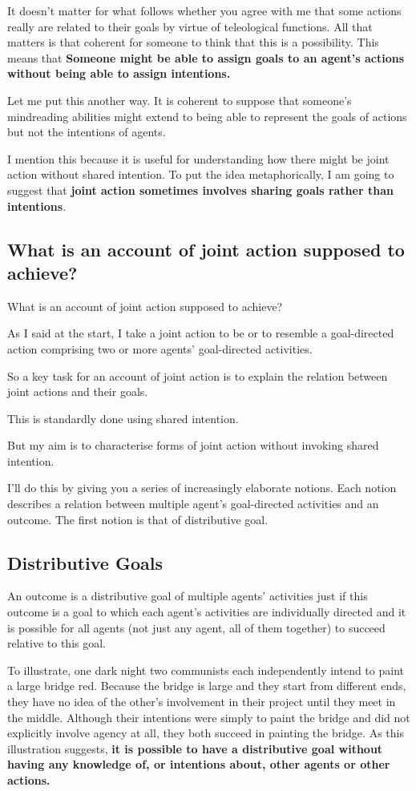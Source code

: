 \documentclass[12pt,a4paper]{extarticle}
\begin{document}
It doesn't matter for what follows whether you agree with me that some actions really are related to their goals by virtue of teleological functions.  
All that matters is that coherent for someone to think that this is a possibility.
This means that \textbf{Someone might be able to assign goals to an agent's actions without being able to assign intentions.}

Let me put this another way.
It is coherent to suppose that someone's mindreading abilities might extend to being able to represent the goals of actions but not the intentions of agents.

I mention this because it is useful for understanding how there might be joint action without shared intention.
To put the idea metaphorically, I am going to suggest that \textbf{joint action sometimes involves sharing goals rather than intentions}.


\subsection{What is an account of joint action supposed to achieve?}
What is an account of joint action supposed to achieve?

As I said at the start, I take a joint action to be or to resemble a goal-directed action comprising two or more agents' goal-directed activities.

So a key task for an account of joint action is to explain the relation between joint actions and their goals.

This is standardly done using shared intention.

But my aim is to characterise forms of joint action without invoking shared intention.

I'll do this by giving you a series of increasingly elaborate notions.  
Each notion describes a relation between multiple agent's goal-directed activities and an outcome.
The first notion is that of distributive goal.


\subsection{Distributive Goals}
An outcome is a distributive goal of multiple agents' activities just if this outcome is a goal to which each agent's activities are individually directed and it is possible for all agents (not just any agent, all of them together) to succeed relative to this goal.

To illustrate, one dark night two communists  each independently intend to paint a large bridge red.   
Because the bridge is large and they start from different ends, they have no idea of the other's involvement in their project until they meet in the middle.  
Although their intentions were simply to paint the bridge and did not explicitly involve agency at all, they both succeed in painting the bridge. 
As this illustration suggests, \textbf{it is possible to have a distributive goal without having any knowledge of, or intentions about, other agents or other actions.}
\end{document}
